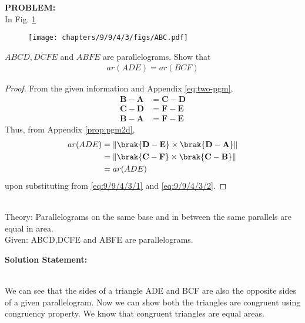 \documentclass[10pt,a4paper]{report}
\let\vec\mathbf
\providecommand{\norm}[1]{\left\lVert#1\right\rVert}
\let\vec\mathbf
\begin{document}
\begin{multicols}{2}

\raggedright \textbf{PROBLEM:}\vspace{2mm}\\
\fi
In Fig.
		\ref{fig:9/9/4/3}
	\begin{figure}[H]
		\centering
 \texttt{[image: chapters/9/9/4/3/figs/ABC.pdf]}
		\caption{}
		\label{fig:9/9/4/3}
  	\end{figure}
	$ABCD, DCFE$ and $ABFE$ are parallelograms. Show that   
	\begin{align}
	ar(ADE) = ar(BCF)
		\label{eq:9/9/4/3}
	\end{align}
	\begin{proof}
		From the given information and Appendix
	  \ref{eq:two-pgm},
  \begin{align}
		\label{eq:9/9/4/3/1}
	  \vec{B}-\vec{A} &= \vec{C} -\vec{D}
	  \\
		\label{eq:9/9/4/3/2}
	  \vec{C}-\vec{D} &= \vec{F} -\vec{E}
	  \\
		\label{eq:9/9/4/3/3}
	  \vec{B}-\vec{A} &= \vec{F} -\vec{E}
  \end{align}
  Thus, from  Appendix
  \ref{prop:pgm2d},
\begin{align}
	ar(ADE)  &= 
	\norm{\brak{\vec{D}-\vec{E}} \times \brak{\vec{D}-\vec{A}}}
	\\
	& = 
	\norm{\brak{\vec{C}-\vec{F}} \times \brak{\vec{C}-\vec{B}}}
	\\
	&=	ar(ADE) 
  \end{align}
  upon substituting from 
		\eqref{eq:9/9/4/3/1}
		and 
		\eqref{eq:9/9/4/3/2}.
	\end{proof}
	\iffalse
\vspace{0.5cm}\raggedright \\
Theory:
Parallelograms on the same base and in between the same parallels are equal in area.\\
Given: ABCD,DCFE and ABFE are parallelograms.
\vspace{2mm} \\ 
\raggedright \textbf{Solution Statement:}\vspace{2mm}
\raggedright \\We can see that the sides of a triangle ADE and BCF are also the opposite sides of a given parallelogram. Now we can show both the triangles are congruent using congruency property. We know that congruent triangles are equal areas.  \\
\vspace{5mm}

\end{multicols}
\end{document}
